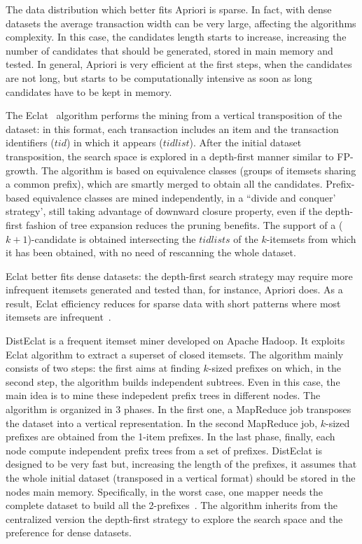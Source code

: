 The data distribution which better fits Apriori is sparse. In fact,
with dense datasets the average transaction width can be very large, affecting
the algorithms complexity. In this case, the candidates length starts to
increase, increasing the number of candidates that should be generated, stored
in main memory and tested. In general, Apriori is very efficient at
the first steps, when the candidates are not long, but starts to be
computationally intensive as soon as long candidates have to be kept in memory.

The Eclat~\cite{Zaki97newalgorithms} algorithm performs the mining from a vertical
transposition of the dataset: in this format, each transaction includes an item
and the transaction identifiers ($tid$) in which it appears ($tidlist$).
After the initial dataset
transposition, the search space is explored in a depth-first manner similar to
FP-growth. The algorithm is based on equivalence classes (groups of itemsets
sharing a common prefix),  which are smartly merged to obtain all the
candidates. Prefix-based equivalence classes are mined independently, in a ``divide and conquer' strategy', still
taking advantage of downward closure property, even if the depth-first fashion
of tree expansion reduces the pruning benefits. The support of a ($k+1$)-candidate
is obtained intersecting the $tidlists$ of the $k$-itemsets from which it has been
obtained, with no need of rescanning the whole dataset.

Eclat better fits dense datasets: the depth-first search strategy may require
more infrequent itemsets generated and tested than, for instance, Apriori does.
As a result, Eclat efficiency reduces for sparse data with short patterns where
most itemsets are infrequent~\cite{vu2012mining}.

DistEclat is a frequent itemset miner developed on Apache Hadoop. It exploits
Eclat algorithm to extract a superset of closed itemsets. The algorithm mainly
consists of two steps: the first aims at finding $k$-sized prefixes on which, in
the second step, the algorithm builds independent subtrees. Even in this case,
the main idea is to mine these indepedent prefix trees in different nodes. The
algorithm is organized in 3 phases. In the first one, a MapReduce job transposes
the dataset into a vertical representation. In the second MapReduce job, $k$-sized
prefixes are obtained from the 1-item prefixes.
In the last phase, finally, each node
compute independent prefix trees from a set of prefixes. DistEclat is designed
to be very fast but, increasing the length of the prefixes,
it assumes that the
whole initial dataset (transposed in a vertical format) should be stored in the
nodes main memory.
Specifically, in the worst case, one mapper needs the complete dataset to build all the 2-prefixes~\cite{bigfim}.
The algorithm inherits from the centralized version the depth-first strategy to
explore the search space and the preference for dense datasets.

